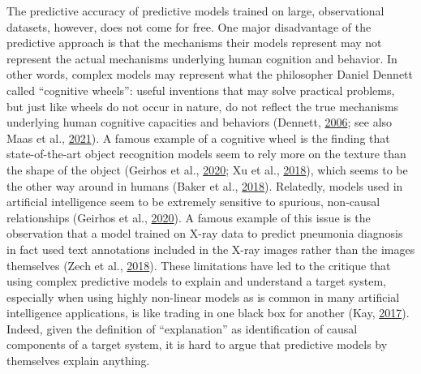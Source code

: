 \documentclass[11pt,american,a4paper,oneside,]{memoir} %
\begin{document}
The predictive accuracy of predictive models trained on large, observational datasets, however, does not come for free. One major disadvantage of the predictive approach is that the mechanisms their models represent may not represent the actual mechanisms underlying human cognition and behavior. In other words, complex models may represent what the philosopher Daniel Dennett called ``cognitive wheels'': useful inventions that may solve practical problems, but just like wheels do not occur in nature, do not reflect the true mechanisms underlying human cognitive capacities and behaviors (Dennett, \protect\hyperlink{ref-Dennett2006-el}{2006}; see also Maas et al., \protect\hyperlink{ref-Van_der_Maas2021-rx}{2021}). A famous example of a cognitive wheel is the finding that state-of-the-art object recognition models seem to rely more on the texture than the shape of the object (Geirhos et al., \protect\hyperlink{ref-Geirhos2020-af}{2020}; Xu et al., \protect\hyperlink{ref-xu2018deeper}{2018}), which seems to be the other way around in humans (Baker et al., \protect\hyperlink{ref-baker2018deep}{2018}). Relatedly, models used in artificial intelligence seem to be extremely sensitive to spurious, non-causal relationships (Geirhos et al., \protect\hyperlink{ref-Geirhos2020-af}{2020}). A famous example of this issue is the observation that a model trained on X-ray data to predict pneumonia diagnosis in fact used text annotations included in the X-ray images rather than the images themselves (Zech et al., \protect\hyperlink{ref-Zech2018-bq}{2018}). These limitations have led to the critique that using complex predictive models to explain and understand a target system, especially when using highly non-linear models as is common in many artificial intelligence applications, is like trading in one black box for another (Kay, \protect\hyperlink{ref-Kay2017-vr}{2017}). Indeed, given the definition of ``explanation'' as identification of causal components of a target system, it is hard to argue that predictive models by themselves explain anything.
\end{document}
